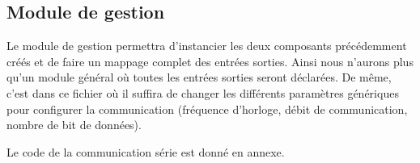 \subsection{Module de gestion}
Le module de gestion permettra d'instancier les deux composants précédemment créés et de faire un mappage complet des entrées sorties. Ainsi nous n'aurons plus qu'un module
général où toutes les entrées sorties seront déclarées. De même, c'est dans ce fichier où il suffira de changer les différents paramètres génériques pour configurer la communication
(fréquence d'horloge, débit de communication, nombre de bit de données).

Le code de la communication série est donné en annexe.
